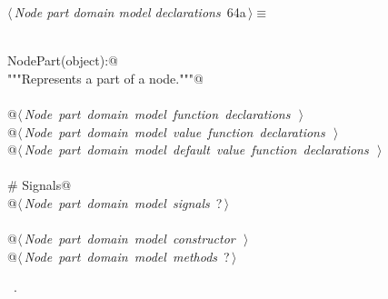 \documentclass[
    a4paper,      %
    10pt,         %
    openright,    %
    notitlepage,  %
    parskip=half, %
]{scrreprt}       %
\theoremstyle{definition}                    %
\begin{document}
\begin{flushleft} \small
\begin{minipage}{\linewidth}\label{scrap106}\raggedright\small
{} $\langle\,${\itshape Node part domain model declarations}\nobreak\ {\footnotesize {64a}}$\,\rangle\equiv$
\vspace{-1exm}
\begin{list}{}{} \item
\mbox{}\lstinline@@\\
\mbox{}\lstinline@class NodePart(object):@\\
\mbox{}\lstinline@    """Represents a part of a node."""@\\
\mbox{}\lstinline@@\\
\mbox{}\lstinline@    @\hbox{$\langle\,${\itshape Node part domain model function declarations}\nobreak\ {\footnotesize {}}$\,\rangle$}\lstinline@@\\
\mbox{}\lstinline@    @\hbox{$\langle\,${\itshape Node part domain model value function declarations}\nobreak\ {\footnotesize {}}$\,\rangle$}\lstinline@@\\
\mbox{}\lstinline@    @\hbox{$\langle\,${\itshape Node part domain model default value function declarations}\nobreak\ {\footnotesize {}}$\,\rangle$}\lstinline@@\\
\mbox{}\lstinline@@\\
\mbox{}\lstinline@    # Signals@\\
\mbox{}\lstinline@    @\hbox{$\langle\,${\itshape Node part domain model signals}\nobreak\ {\footnotesize ?}$\,\rangle$}\lstinline@@\\
\mbox{}\lstinline@@\\
\mbox{}\lstinline@    @\hbox{$\langle\,${\itshape Node part domain model constructor}\nobreak\ {\footnotesize {}}$\,\rangle$}\lstinline@@\\
\mbox{}\lstinline@    @\hbox{$\langle\,${\itshape Node part domain model methods}\nobreak\ {\footnotesize ?}$\,\rangle$}\lstinline@@\\
\mbox{}\lstinline@@{\NWsep}
\end{list}
\vspace{-1.5ex}
\footnotesize
\begin{list}{}{\setlength{\itemsep}{-\parsep}\setlength{\itemindent}{-\leftmargin}}
\item \NWtxtMacroRefIn\ .

\item{}
\end{list}
\end{minipage}\vspace{4ex}
\end{flushleft}
\end{document}
